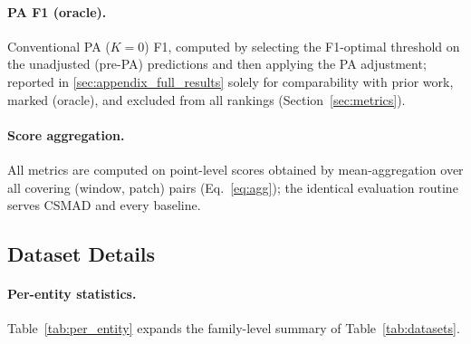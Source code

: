 \paragraph{PA F1 (oracle).}
Conventional PA ($K{=}0$) F1, computed by selecting the F1-optimal threshold on the unadjusted
(pre-PA) predictions and then applying the PA adjustment; reported in \ref{sec:appendix_full_results}
solely for comparability with prior work, marked (oracle), and excluded from all rankings
(Section~\ref{sec:metrics}).

\paragraph{Score aggregation.}
All metrics are computed on point-level scores obtained by mean-aggregation over all covering
(window, patch) pairs (Eq.~\ref{eq:agg}); the identical evaluation routine serves CSMAD and
every baseline.

\subsection{Dataset Details}
\label{sec:appendix_dataset}

\paragraph{Per-entity statistics.}
Table~\ref{tab:per_entity} expands the family-level summary of Table~\ref{tab:datasets}.


